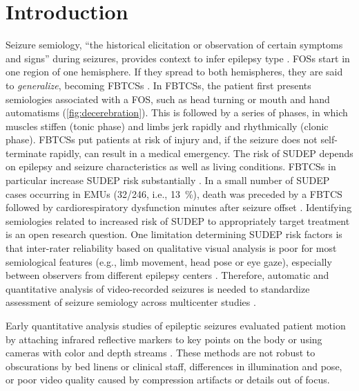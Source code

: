 \section{Introduction}



Seizure semiology, ``the historical elicitation or observation of certain symptoms and signs'' during seizures, provides context to infer epilepsy type \cite{fisher_operational_2017}.
\Acp{FOS} start in one region of one hemisphere.
If they spread to both hemispheres, they are said to \emph{generalize}, becoming \acp{FBTCS} \cite{fisher_operational_2017}.
In \acp{FBTCS}, the patient first presents semiologies associated with a \ac{FOS}, such as head turning or mouth and hand automatisms (\cref{fig:decerebration}).
This is followed by a series of phases, in which muscles stiffen (tonic phase) and limbs jerk rapidly and rhythmically (clonic phase).
\Acp{FBTCS} put patients at risk of injury and, if the seizure does not self-terminate rapidly, can result in a medical emergency.
The risk of \ac{SUDEP} depends on epilepsy and seizure characteristics as well as living conditions.
\Acp{FBTCS} in particular increase \ac{SUDEP} risk substantially \cite{nashef_unifying_2012}.
In a small number of \ac{SUDEP} cases occurring in \acp{EMU} (32/246, i.e., 13~\%), death was preceded by a \ac{FBTCS} followed by cardiorespiratory dysfunction minutes after seizure offset \cite{ryvlin_incidence_2013}.
Identifying semiologies related to increased risk of \ac{SUDEP} to appropriately target treatment is an open research question.
One limitation determining \ac{SUDEP} risk factors is that inter-rater reliability based on qualitative visual analysis is poor for most semiological features (e.g., limb movement, head pose or eye gaze), especially between observers from different epilepsy centers \cite{tufenkjian_seizure_2012}.
Therefore, automatic and quantitative analysis of video-recorded seizures is needed to standardize assessment of seizure semiology across multicenter studies \cite{ahmedtaristizabal_automated_2017}.




Early quantitative analysis studies of epileptic seizures evaluated patient motion by attaching infrared reflective markers to key points on the body or using cameras with color and depth streams \cite{li_z_movement_2002,cunha_movement_2003,odwyer_lateralizing_2007,cunha_neurokinect_2016}.
These methods are not robust to obscurations by bed linens or clinical staff, differences in illumination and pose, or poor video quality caused by compression artifacts or details out of focus.

